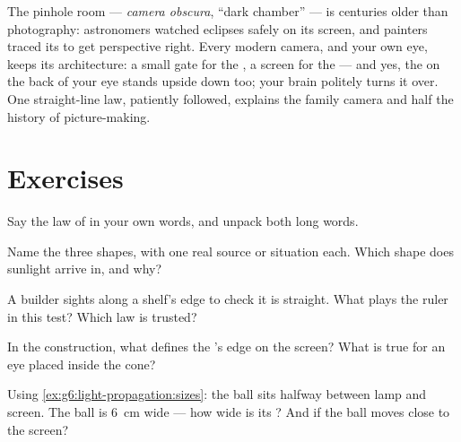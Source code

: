 \begin{remark}\label{rem:g6:light-propagation:history}
The pinhole room --- \emph{camera obscura}, ``dark chamber'' ---
is centuries older than photography: astronomers watched eclipses
safely on its screen, and painters traced its  to get
perspective right. Every modern camera, and your own eye, keeps
its architecture: a small gate for the , a screen for the
 --- and yes, the  on the back of your eye stands upside
down too; your brain politely turns it over. One straight-line law,
patiently followed, explains the family camera and half the
history of picture-making.
\end{remark}

\section{Exercises}

\begin{exercise}[$\star$]\label{exo:g6:light-propagation:1}
Say the law of  in your own words, and
unpack both long words.
\end{exercise}

\begin{exercise}[$\star$]\label{exo:g6:light-propagation:2}
Name the three  shapes, with one real source or situation
each. Which shape does sunlight arrive in, and why?
\end{exercise}

\begin{exercise}[$\star$]\label{exo:g6:light-propagation:3}
A builder sights along a shelf's edge to check it is straight.
What plays the ruler in this test? Which law is trusted?
\end{exercise}

\begin{exercise}[$\star$]\label{exo:g6:light-propagation:4}
In the  construction, what defines the 's edge on the
screen? What is true for an eye placed inside the  cone?
\end{exercise}

\begin{exercise}[$\star$]\label{exo:g6:light-propagation:5}
Using \cref{ex:g6:light-propagation:sizes}: the ball sits halfway
between lamp and screen. The ball is \qty{6}{cm} wide --- how wide
is its ? And if the ball moves close to the screen?
\end{exercise}

